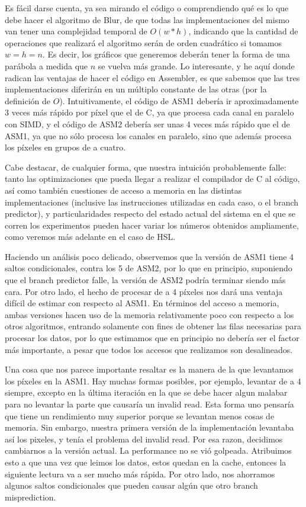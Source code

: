 Es fácil darse cuenta, ya sea mirando el código o comprendiendo qué es lo que debe hacer el algoritmo de Blur, de que todas las implementaciones del mismo van tener una complejidad temporal de $O(w*h)$, indicando que la cantidad de operaciones que realizará el algoritmo serán de orden cuadrático si tomamos $w = h = n$. Es decir, los gráficos que generemos deberán tener la forma de una parábola a medida que $n$ se vuelva más grande. Lo interesante, y he aquí donde radican las ventajas de hacer el código en Assembler, es que sabemos que las tres implementaciones diferirán en un múltiplo constante de las otras (por la definición de $O$). Intuitivamente, el código de ASM1 debería ir aproximadamente 3 veces más rápido por píxel que el de C, ya que procesa cada canal en paralelo con SIMD, y el código de ASM2 debería ser unas 4 veces más rápido que el de ASM1, ya que no sólo procesa los canales en paralelo, sino que además procesa los píxeles en grupos de a cuatro.

Cabe destacar, de cualquier forma, que nuestra intuición probablemente falle: tanto las optimizaciones que pueda llegar a realizar el compilador de C al código, así como también cuestiones de acceso a memoria en las distintas implementaciones (inclusive las instrucciones utilizadas en cada caso, o el branch predictor), y particularidades respecto del estado actual del sistema en el que se corren los experimentos pueden hacer variar los números obtenidos ampliamente, como veremos más adelante en el caso de HSL.

Haciendo un análisis poco delicado, observemos que la versión de ASM1 tiene 4 saltos condicionales, contra los 5 de ASM2, por lo que en principio, suponiendo que el branch predictor falle, la versión de ASM2 podría terminar siendo más cara. Por otro lado, el hecho de procesar de a 4 píxeles nos dará una ventaja difícil de estimar con respecto al ASM1. En términos del acceso a memoria, ambas versiones hacen uso de la memoria relativamente poco con respecto a los otros algoritmos, entrando solamente con fines de obtener las filas necesarias para procesar los datos, por lo que estimamos que en principio no debería ser el factor más importante, a pesar que todos los accesos que realizamos son desalineados.

Una cosa que nos parece importante resaltar es la manera de la que levantamos los píxeles en la ASM1. Hay muchas formas posibles, por ejemplo, levantar de a 4 siempre, excepto en la última iteración en la que se debe hacer algun malabar para no levantar la parte que causaría un invalid read.
Esta forma uno pensaría que tiene un rendimiento muy superior porque se levantan menos cosas de memoria.
Sin embargo, nuestra primera versión de la implementación levantaba así los pixeles, y tenía el problema del invalid read. Por esa razon, decidimos cambiarnos a la versión actual. La performance no se vió golpeada. Atribuimos esto a que una vez que leimos los datos, estos quedan en la cache, entonces la siguiente lectura va a ser mucho más rápida. Por otro lado, nos ahorramos algunos saltos condicionales que pueden causar algún que otro branch misprediction.


